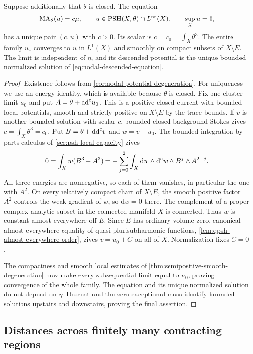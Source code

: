 \begin{theorem}\label{thm:nodal-closed-full-convergence}
Suppose additionally that $\theta$ is closed. The equation
\[
 \mathrm{MA}_\theta(u)=c\mu,
 \qquad u\in\mathrm{PSH}(X,\theta)\cap L^\infty(X),
 \qquad \sup_Xu=0,
\]
has a unique pair $(c,u)$ with $c>0$. Its scalar is $c=c_0=\int_X\theta^3$. The entire family $u_\varepsilon$ converges to $u$ in $L^1(X)$ and smoothly on compact subsets of $X\setminus E$. The limit is independent of $\eta$, and its descended potential is the unique bounded normalized solution of \eqref{eq:nodal-descended-equation}.
\end{theorem}
\begin{proof}
Existence follows from \cref{cor:nodal-potential-degeneration}. For uniqueness we use an energy identity, which is available because $\theta$ is closed. Fix one cluster limit $u_0$ and put $A=\theta+\mathrm{dd}^{\mathrm{c}} u_0$. This is a positive closed current with bounded local potentials, smooth and strictly positive on $X\setminus E$ by the trace bounds. If $v$ is another bounded solution with scalar $c$, bounded closed-background Stokes gives $c=\int_X\theta^3=c_0$. Put $B=\theta+\mathrm{dd}^{\mathrm{c}} v$ and $w=v-u_0$. The bounded integration-by-parts calculus of \cref{sec:psh-local-capacity} gives
\[
 0=\int_Xw(B^3-A^3)
   =-\sum_{j=0}^2\int_X\mathrm{d}w\wedge\mathrm d^{\mathrm c} w
                         \wedge B^j\wedge A^{2-j}.
\]
All three energies are nonnegative, so each of them vanishes, in particular the one with $A^2$. On every relatively compact chart of $X\setminus E$, the smooth positive factor $A^2$ controls the weak gradient of $w$, so $\mathrm{d}w=0$ there. The complement of a proper complex analytic subset in the connected manifold $X$ is connected. Thus $w$ is constant almost everywhere off $E$. Since $E$ has ordinary volume zero, canonical almost-everywhere equality of quasi-plurisubharmonic functions, \cref{lem:qpsh-almost-everywhere-order}, gives $v=u_0+C$ on all of $X$. Normalization fixes $C=0$.

The compactness and smooth local estimates of \cref{thm:semipositive-smooth-degeneration} now make every subsequential limit equal to $u_0$, proving convergence of the whole family. The equation and its unique normalized solution do not depend on $\eta$. Descent and the zero exceptional mass identify bounded solutions upstairs and downstairs, proving the final assertion.
\end{proof}

\subsection{Distances across finitely many contracting regions}
\label{subsec:finite-collapse-distance}

